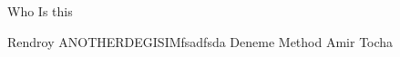 \documentclass{exam}
\begin{document}
\begin{questions}
\question Who Is this\newline
\begin{oneparchoices}
\choice Rendroy
\choice ANOTHERDEGISIMfsadfsda
\choice Deneme Method
\choice Amir Tocha
\end{oneparchoices}
\end{questions}
\end{document}
